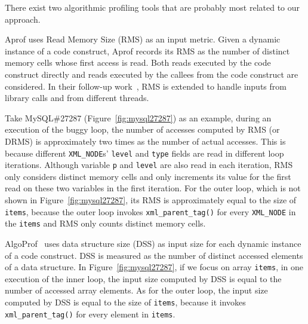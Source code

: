 
There exist two algorithmic  profiling tools that are
probably most related to our approach.

Aprof \citep{Aprof1} uses Read Memory Size (RMS) as an input metric. 
Given a dynamic instance of a code construct,
Aprof records its RMS as the number of distinct memory cells 
whose first access is read. 
Both reads executed by the code construct directly and 
reads executed by the callees from the code construct are considered. 
In their follow-up work~\cite{Aprof2}, 
RMS is extended  to handle inputs from library calls 
and from different threads. 

Take MySQL\#27287 (Figure~\ref{fig:mysql27287}) as an example, 
during an execution of the buggy loop, the number of accesses
computed by RMS (or DRMS) is approximately 
two times as the number of actual accesses. 
This is because 
different \texttt{XML\_NODE}s' \texttt{level} and \texttt{type} 
fields are read in different loop iterations. 
Although variable \texttt{p} and \texttt{level} are also read in each iteration,
RMS only considers distinct memory cells and 
only increments its value for the first read on these 
two variables in the first iteration. 
For the outer loop, which is not shown in Figure~\ref{fig:mysql27287}, 
its RMS is approximately equal to the size of \texttt{items}, 
because the outer loop invokes \texttt{xml\_parent\_tag()} for every
\texttt{XML\_NODE} in the \texttt{items} and RMS only 
counts distinct memory cells. 

AlgoProf~\citep{AlgoProf} uses data structure size (DSS) 
as input size for each dynamic instance of a code construct.
DSS is measured as the number of distinct accessed elements of a data structure.  
In Figure~\ref{fig:mysql27287}, if we focus on array \texttt{items},
in one execution of the inner loop, the input size computed by DSS 
is equal to the number of accessed array elements. 
As for the outer loop, the input size computed by DSS  is
equal to the size of  \texttt{items}, because
it invokes \texttt{xml\_parent\_tag()} for every element in \texttt{items}.


